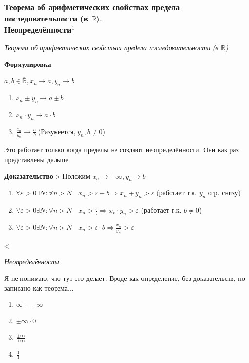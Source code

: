 \documentclass{article}
\begin{document}
\subsubsection{Теорема об арифметических свойствах предела последовательности (в \texorpdfstring{$\overline{\mathbb{R}}$}{R с чертой}).\texorpdfstring{\\}{} Неопределённости\texorpdfstring{$^1$}{}}
\textit{Теорема об арифметических свойствах предела последовательности (в $\overline{\mathbb{R}}$)}

\textbf{Формулировка}

$a, b \in \overline{\mathbb{R}}, x_n \rightarrow a, y_n \rightarrow b$
\begin{enumerate}
    \item $x_n \pm y_n \rightarrow a\pm b$
    \item $x_n \cdot y_n \rightarrow a\cdot b$
    \item $\frac{x_n}{y_n} \rightarrow \frac{a}{b}$ (Разумеется, $y_n, b \ne 0$)
\end{enumerate}
Это работает только когда пределы не создают неопределённости. Они как раз представлены дальше

\textbf{Доказательство}
$\rhd$
Положим $x_n \rightarrow +\infty, y_n \rightarrow b$
\begin{enumerate}
    \item $\forall \varepsilon > 0 \exists N : \forall n > N \quad x_n > \varepsilon - b \Rightarrow x_n + y_n > \varepsilon$ (работает т.к. $y_n$ огр. снизу)
    \item $\forall \varepsilon > 0 \exists N : \forall n > N \quad x_n > \frac{\varepsilon}{b} \Rightarrow x_n \cdot y_n > \varepsilon$ (работает т.к. $b \ne 0$)
    \item $\forall \varepsilon > 0 \exists N : \forall n > N \quad x_n > \varepsilon \cdot b \Rightarrow \frac{x_n}{y_n} > \varepsilon$
\end{enumerate}
$\lhd$

\textit{Неопределённости}

Я не понимаю, что тут это делает. Вроде как определение, без доказательств, но записано как теорема...
\begin{enumerate}
    \item $\infty + -\infty$
    \item $\pm \infty \cdot 0$
    \item $\frac{\pm \infty}{\pm \infty}$
    \item $\frac{0}{0}$
\end{enumerate}
\end{document}
